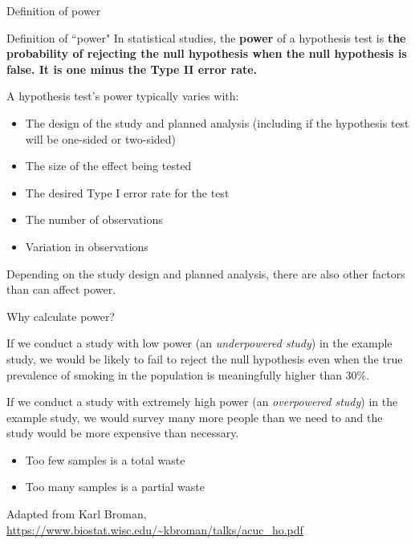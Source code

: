 \documentclass[ignorenonframetext,]{beamer}
\providecommand{\tightlist}{%
  \setlength{\itemsep}{0pt}\setlength{\parskip}{0pt}}
\begin{document}
\begin{frame}{Definition of power}

\begin{block}{Definition of ``power"}
In statistical studies, the \textbf{power} of a hypothesis test is \textbf{the probability of rejecting the null hypothesis when the null hypothesis is false. It is one minus the Type II error rate.} 
\end{block}

A hypothesis test's power typically varies with:

\begin{itemize}
\tightlist
\item
  The design of the study and planned analysis (including if the
  hypothesis test will be one-sided or two-sided)
\item
  The size of the effect being tested
\item
  The desired Type I error rate for the test
\item
  The number of observations
\item
  Variation in observations
\end{itemize}

Depending on the study design and planned analysis, there are also other
factors than can affect power.

\end{frame}

\begin{frame}{Why calculate power?}

If we conduct a study with low power (an \emph{underpowered study}) in
the example study, we would be likely to fail to reject the null
hypothesis even when the true prevalence of smoking in the population is
meaningfully higher than 30\%.

If we conduct a study with extremely high power (an \emph{overpowered
study}) in the example study, we would survey many more people than we
need to and the study would be more expensive than necessary.

\begin{itemize}
\tightlist
\item
  Too few samples is a total waste
\item
  Too many samples is a partial waste
\end{itemize}

\footnotesize{Adapted from Karl Broman, \url{https://www.biostat.wisc.edu/~kbroman/talks/acuc_ho.pdf}}

\end{frame}
\end{document}
